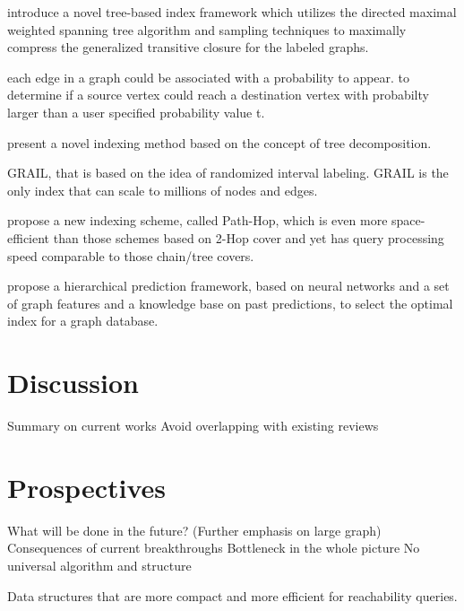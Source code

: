 \documentclass[12pt, conference, compsocconf]{../IEEEtran}
\begin{document}
\citep{1057} introduce a novel tree-based index framework which utilizes the directed maximal weighted spanning tree algorithm and sampling techniques to maximally compress the generalized transitive closure for the labeled graphs.

\citep{1056} each edge in a graph could be associated with a probability to appear. to determine if a source vertex could reach a destination vertex with probabilty larger than a user specified probability value t.

\citep{1058} present a novel indexing method based on the concept of tree decomposition. 

\citep{1059} GRAIL, that is based on the idea of randomized interval labeling. GRAIL is the only index that can scale to millions of nodes and edges.

\citep{1060} propose a new indexing scheme, called Path-Hop, which is even more space-efficient than those schemes based on 2-Hop cover and yet has query processing speed comparable to those chain/tree covers. 

\citep{1061} propose a hierarchical prediction framework, based on neural networks and a set of graph features and a knowledge base on past predictions, to select the optimal index for a graph database.

\section{Discussion}

Summary on current works
  Avoid overlapping with existing reviews

\section{Prospectives}

What will be done in the future? (Further emphasis on large graph)
  Consequences of current breakthroughs
  Bottleneck in the whole picture
    No universal algorithm and structure

Data structures that are more compact and more efficient for reachability queries.



\end{document}

